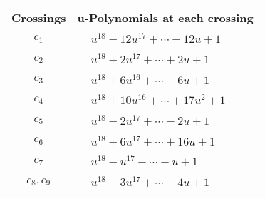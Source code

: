 \documentclass[1p]{elsarticle_modified}
\theoremstyle{definition}
\begin{document}
\begin{tabular}{m{50pt}|m{274pt}}
Crossings & \hspace{64pt}u-Polynomials at each crossing \\
\hline $$\begin{aligned}c_{1}\end{aligned}$$&$\begin{aligned}
&u^{18}-12 u^{17}+\cdots-12 u+1
\end{aligned}$\\
\hline $$\begin{aligned}c_{2}\end{aligned}$$&$\begin{aligned}
&u^{18}+2 u^{17}+\cdots+2 u+1
\end{aligned}$\\
\hline $$\begin{aligned}c_{3}\end{aligned}$$&$\begin{aligned}
&u^{18}+6 u^{16}+\cdots-6 u+1
\end{aligned}$\\
\hline $$\begin{aligned}c_{4}\end{aligned}$$&$\begin{aligned}
&u^{18}+10 u^{16}+\cdots+17 u^2+1
\end{aligned}$\\
\hline $$\begin{aligned}c_{5}\end{aligned}$$&$\begin{aligned}
&u^{18}-2 u^{17}+\cdots-2 u+1
\end{aligned}$\\
\hline $$\begin{aligned}c_{6}\end{aligned}$$&$\begin{aligned}
&u^{18}+6 u^{17}+\cdots+16 u+1
\end{aligned}$\\
\hline $$\begin{aligned}c_{7}\end{aligned}$$&$\begin{aligned}
&u^{18}- u^{17}+\cdots- u+1
\end{aligned}$\\
\hline $$\begin{aligned}c_{8},c_{9}\end{aligned}$$&$\begin{aligned}
&u^{18}-3 u^{17}+\cdots-4 u+1
\end{aligned}$\\

\end{tabular}
\end{document}
